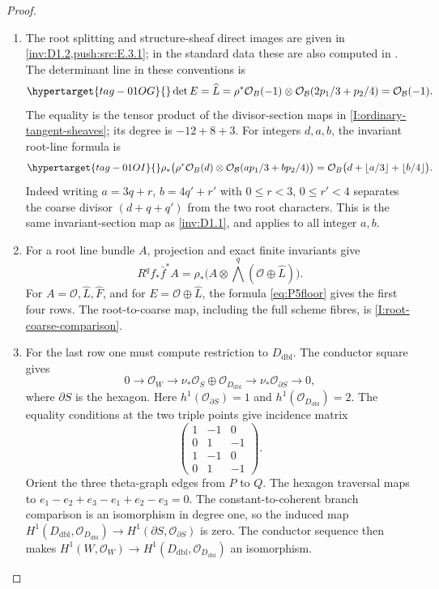 \begin{proof}
\begin{enumerate}[label=\arabic*.,leftmargin=*]
\item The root splitting and structure-sheaf direct images are given in
\cref{inv:D1.2,push:src:E.3.1}; in the standard data these are also computed in
\cite[Proposition~6.6, pp.~77--78; Lemma~6.7, p.~78;
Proposition~6.10, pp.~79--80]{DuEtAl2026v1}.
The determinant line in these conventions is
\begin{equation}\hypertarget{tag-01OG}{}\label{eq:P5L}
 \det E=\widehat L
 =\rho^*\mathcal O_B(-1)\otimes
   \mathcal O_{\mathcal B}(2p_1/3+p_2/4)
 =\mathcal O_{\mathcal B}(-1).
\end{equation}
The equality is the tensor product of the divisor-section maps
in \cref{I:ordinary-tangent-sheaves}; its degree is $-12+8+3$.
For integers $d,a,b$, the invariant root-line formula is
\begin{equation}\hypertarget{tag-01OI}{}\label{eq:P5floor}
 \rho_*\bigl(\rho^*\mathcal O_B(d)\otimes
 \mathcal O_{\mathcal B}(ap_1/3+bp_2/4)\bigr)
 =\mathcal O_B\bigl(d+\lfloor a/3\rfloor+\lfloor b/4\rfloor\bigr).
\end{equation}
Indeed writing $a=3q+r$, $b=4q'+r'$ with
$0\leq r<3$, $0\leq r'<4$ separates the coarse divisor
$(d+q+q')$ from the two root characters. This is the same
invariant-section map as \cref{inv:D1.1}, and applies to all
integer $a,b$.

\item For a root line bundle $A$, projection and exact finite
invariants give
\[
 R^qf_*\bar f^*A=\rho_*\bigl(A\otimes
              \bigwedge^q(\mathcal O\oplus\widehat L)\bigr).
\]
For $A=\mathcal O,\widehat L,\widehat F$, and for
$E=\mathcal O\oplus\widehat L$, the formula
\eqref{eq:P5floor} gives the first four rows. The root-to-coarse
map, including the full scheme fibres, is \cref{I:root-coarse-comparison}.

\item For the last row one must compute restriction to $D_{\mathrm{dbl}}$.  The conductor
square gives
\[
0\to\mathcal O_W\to\nu_*\mathcal O_S\oplus\mathcal O_{D_{\mathrm{dbl}}}
\to\nu_*\mathcal O_{\partial S}\to0,
\]
where $\partial S$ is the hexagon.  Here $h^1(\mathcal O_{\partial S})=1$
and $h^1(\mathcal O_{D_{\mathrm{dbl}}})=2$.  The equality conditions at the two triple
points give incidence matrix
\[
 \begin{pmatrix}1&-1&0\\0&1&-1\\1&-1&0\\0&1&-1\end{pmatrix}.
\]
Orient the three theta-graph edges from $P$ to $Q$.  The hexagon
traversal maps to $e_1-e_2+e_3-e_1+e_2-e_3=0$.  The constant-to-coherent
branch comparison is an isomorphism in degree one, so the induced map
$H^1(D_{\mathrm{dbl}},\mathcal O_{D_{\mathrm{dbl}}})\to H^1(\partial S,\mathcal O_{\partial S})$ is
zero.  The conductor sequence then makes
$H^1(W,\mathcal O_W)\to H^1(D_{\mathrm{dbl}},\mathcal O_{D_{\mathrm{dbl}}})$ an isomorphism.


\end{enumerate}
\end{proof}
